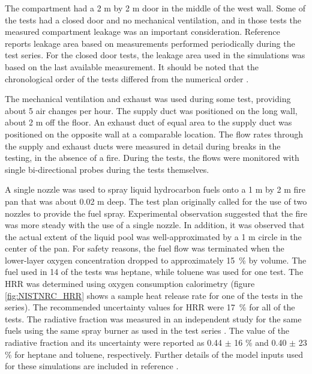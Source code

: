 The compartment had a 2 m by 2 m door in the middle of the west wall. Some of the tests had a closed door and no mechanical ventilation, and in those tests the measured compartment leakage was an important consideration. Reference \cite{Hamins:2005} reports leakage area based on measurements performed periodically during the test series. For the closed door tests, the leakage area used in the simulations was based on the last available measurement. It should be noted that the chronological order of the tests differed from the numerical order \cite{Hamins:2005}.

The mechanical ventilation and exhaust was used during some test, providing about 5 air changes per hour. The supply duct was positioned on the long wall, about 2 m off the floor. An exhaust duct of equal area to the supply duct was positioned on the opposite wall at a comparable location. The flow rates through the supply and exhaust ducts were measured in detail during breaks in the testing, in the absence of a fire. During the tests, the flows were monitored with single bi-directional probes during the tests themselves.

A single nozzle was used to spray liquid hydrocarbon fuels onto a 1 m by 2 m fire pan that was about 0.02 m deep. The test plan originally called for the use of two nozzles to provide the fuel spray. Experimental observation suggested that the fire was more steady with the use of a single nozzle. In addition, it was observed that the actual extent of the liquid pool was well-approximated by a 1 m circle in the center of the pan. For safety reasons, the fuel flow was terminated when the lower-layer oxygen concentration dropped to approximately 15~\% by volume. The fuel used in 14 of the tests was heptane, while toluene was used for one test. The HRR was determined using oxygen consumption calorimetry (figure \ref{fig:NISTNRC_HRR} shows a sample heat release rate for one of the tests in the series). The recommended uncertainty values for HRR were 17~\% for all of the tests. The radiative fraction was measured in an independent study for the same fuels using the same spray burner as used in the test series \cite{Hamins:2003}. The value of the radiative fraction and its uncertainty were reported as 0.44 $\pm$ 16 \% and 0.40 $\pm$ 23 \% for heptane and toluene, respectively. Further details of the model inputs used for these simulations are included in reference \cite{NRCNUREG1824}.

